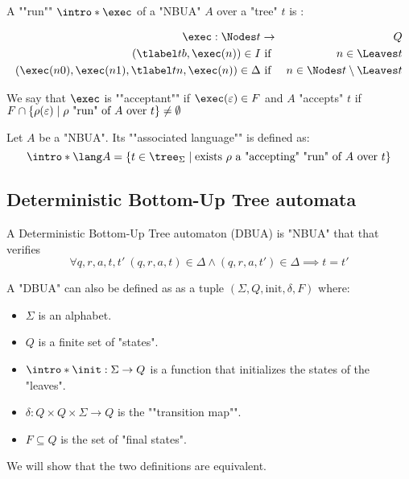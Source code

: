 \documentclass{article}
\begin{document}
\begin{definition}
	A ""run"" $\intro* \exec$ of a "NBUA" $A$ over a "tree" $t$ is :

	\begin{eqnarray*}
		\exec : \Nodes t &\to& Q \\
		(\tlabel t b,  \exec (n) ) \in I &\text{ if }& n \in \Leaves t \\
		(\exec (n0), \exec (n1), \tlabel t n, \exec (n)) \in \Delta &\text{ if }& n \in \Nodes t \setminus \Leaves t
	\end{eqnarray*}

	We say that $\exec$ is ""acceptant"" if $\exec (\varepsilon) \in F$ and $A$ "accepts" $t$ if
	$F \cap \left\{\rho(\varepsilon) \mid \text{$\rho$ "run" of~$A$ over~$t$}\right\} \neq \emptyset$
\end{definition}


\begin{definition}
	Let $A$ be a "NBUA". Its ""associated language"" is defined as:
	\[\intro* \lang A = \setdef {t \in \tree_{\Sigma}} {\text{exists $\rho$ a "accepting" "run" of $A$ over $t$}} \]
\end{definition}

\subsection{Deterministic Bottom-Up Tree automata}

\begin{definition}
	A Deterministic Bottom-Up Tree automaton (DBUA) is "NBUA" that that verifies
	\[ \forall q,r,a,t,t' \ (q,r,a,t) \in \Delta \land   (q,r,a,t') \in \Delta  \implies t = t' \]
\end{definition}


\begin{remark}
	A "DBUA" can also be defined as as a tuple $(\Sigma, Q, \text{init}, \delta, F)$ where:
	\begin{itemize}
		\item $\Sigma$ is an alphabet.
		\item $Q$ is a finite set of "states".
		\item $\intro *\init : \Sigma \to Q$ is a function that initializes the states of the "leaves".
		\item $\delta : Q \times Q \times \Sigma \to Q$ is the ""transition map"".
		\item $F \subseteq Q$ is the set of "final states".
	\end{itemize}
	We will show that the two definitions are equivalent.
\end{remark}
\end{document}
